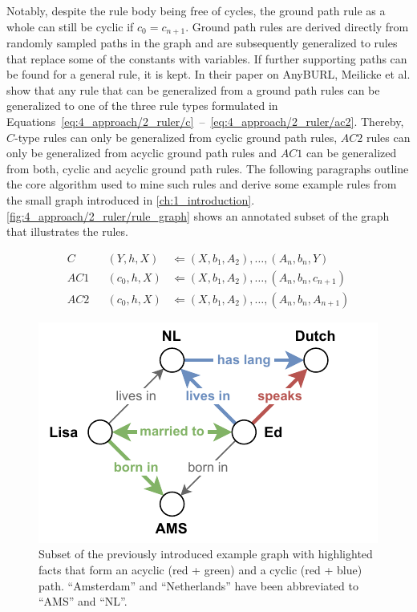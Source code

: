 Notably, despite the rule body being free of cycles, the ground path rule as a whole can still be cyclic if $c_0 = c_{n+1}$. Ground path rules are derived directly from randomly sampled paths in the graph and are subsequently generalized to rules that replace some of the constants with variables. If further supporting paths can be found for a general rule, it is kept. In their paper on AnyBURL, Meilicke et al. show that any rule that can be generalized from a ground path rules can be generalized to one of the three rule types formulated in Equations~\ref{eq:4_approach/2_ruler/c}~--~\ref{eq:4_approach/2_ruler/ac2}. Thereby, $C$-type rules can only be generalized from cyclic ground path rules, $AC2$ rules can only be generalized from acyclic ground path rules and $AC1$ can be generalized from both, cyclic and acyclic ground path rules. The following paragraphs outline the core algorithm used to mine such rules and derive some example rules from the small graph introduced in \autoref{ch:1_introduction}. \autoref{fig:4_approach/2_ruler/rule_graph} shows an annotated subset of the graph that illustrates the rules.

\begin{align}
    C   && (Y, h, X)   &\Leftarrow (X, b_1, A_2), \dots, (A_n, b_n, Y)
    \label{eq:4_approach/2_ruler/c} \\
    AC1 && (c_0, h, X) &\Leftarrow (X, b_1, A_2), \dots, (A_n, b_n, c_{n+1})
    \label{eq:4_approach/2_ruler/ac1} \\
    AC2 && (c_0, h, X) &\Leftarrow (X, b_1, A_2), \dots, (A_n, b_n, A_{n+1})
    \label{eq:4_approach/2_ruler/ac2}
\end{align}

\begin{figure}[t]
    \centering
    \includegraphics{4_approach/2_ruler/rule_graph}
    \caption{Subset of the previously introduced example graph with highlighted facts that form an acyclic (red + green) and a cyclic (red + blue) path.  ``Amsterdam'' and ``Netherlands'' have been abbreviated to ``AMS'' and ``NL''.}
    \label{fig:4_approach/2_ruler/rule_graph}
\end{figure}

